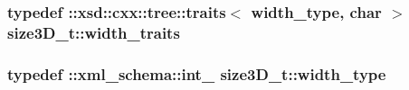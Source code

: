 \hypertarget{classsize3D__t_a98b58b7e1830b6e07c64d7a6dd10aae5}{
\subsubsection[{width\-\_\-traits}]{\setlength{\rightskip}{0pt plus 5cm}typedef \-::xsd\-::cxx\-::tree\-::traits$<$ {\bf width\-\_\-type}, char $>$ {\bf size3\-D\-\_\-t\-::width\-\_\-traits}}}\label{classsize3D__t_a98b58b7e1830b6e07c64d7a6dd10aae5}
\hypertarget{classsize3D__t_a7d35a723ccd7d990ae9b91f8d8856a69}{
\subsubsection[{width\-\_\-type}]{\setlength{\rightskip}{0pt plus 5cm}typedef \-::{\bf xml\-\_\-schema\-::int\-\_\-} {\bf size3\-D\-\_\-t\-::width\-\_\-type}}}\label{classsize3D__t_a7d35a723ccd7d990ae9b91f8d8856a69}


